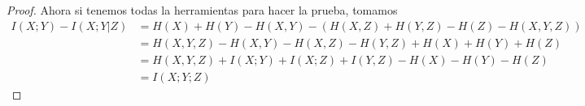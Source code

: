 \begin{enumerate}
\begin{proof}
Ahora si tenemos todas la herramientas para hacer la prueba, tomamos
\begin{align*}
    I(X;Y)-I(X;Y|Z)&= H(X)+H(Y) -H(X,Y)-(H(X,Z)+H(Y,Z)-H(Z)-H(X,Y,Z))\\
    &=H(X,Y,Z)-H(X,Y)-H(X,Z)-H(Y,Z)+H(X)+H(Y)+H(Z)\\
    &=H(X,Y,Z)+I(X;Y)+I(X;Z)+I(Y,Z)-H(X)-H(Y)-H(Z)\\
    &=I(X;Y;Z)
\end{align*}

\end{proof}

\end{enumerate}
